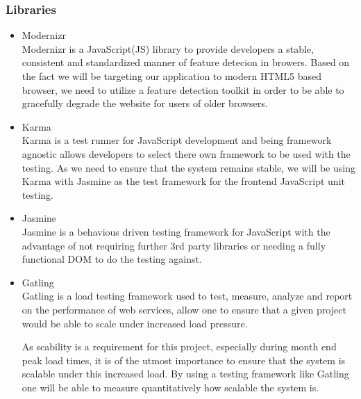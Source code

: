 \documentclass[a4paper,10pt]{article}
\begin{document}
\subsubsection{Libraries}
	\begin{itemize}
		\item Modernizr\\
			Modernizr is a JavaScript(JS) library to provide developers a stable, consistent and standardized manner of feature detecion in browers. Based on the fact we will be targeting our application to modern HTML5 based browser, we need to utilize a feature detection toolkit in order to be able to gracefully degrade the website for users of older browsers.
		\item Karma\\
			Karma is a test runner for JavaScript development and being framework agnostic allows developers to select there own framework to be used with the testing. As we need to ensure that the system remains stable, we will be using Karma with Jasmine as the test framework for the frontend JavaScript unit testing.
		\item Jasmine\\
			Jasmine is a behavious driven testing framework for JavaScript with the advantage of not requiring further 3rd party libraries or needing a fully functional DOM to do the testing against.
		\item Gatling\\
			Gatling is a load testing framework used to test, measure, analyze and report on the performance of web services, allow one to ensure that a given project would be able to scale under increased load pressure.

			As scability is a requirement for this project, especially during month end peak load times, it is of the utmost importance to ensure that the system is scalable under this increased load. By using a testing framework like Gatling one will be able to measure quantitatively how scalable the system is.
	\end{itemize}
\end{document}
